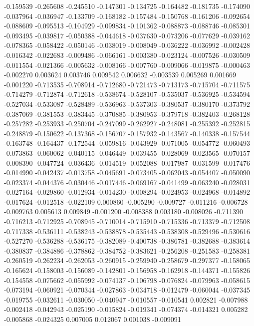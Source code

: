 -0.159539
-0.265608
-0.245510
-0.147301
-0.134725
-0.164482
-0.181735
-0.174090
-0.037964
-0.036947
-0.133709
-0.168182
-0.157484
-0.150768
-0.161206
-0.092654
-0.088609
-0.095513
-0.104929
-0.099834
-0.101362
-0.088873
-0.088746
-0.085301
-0.093495
-0.039817
-0.050388
-0.044618
-0.037630
-0.073206
-0.077629
-0.039162
-0.078365
-0.058422
-0.050146
-0.038019
-0.008049
-0.036222
-0.036992
-0.002428
-0.016342
-0.022683
-0.009486
-0.066161
-0.003380
-0.023124
-0.007526
-0.030509
-0.011554
-0.021366
-0.005632
-0.008166
-0.007760
-0.009066
-0.019875
-0.000463
-0.002270
0.003624
0.003746
0.009542
0.006632
-0.003539
0.005269
0.001669
-0.001220
-0.713535
-0.708914
-0.712680
-0.721473
-0.713173
-0.715704
-0.711575
-0.714279
-0.712874
-0.712618
-0.538674
-0.528107
-0.535037
-0.536925
-0.534594
-0.527034
-0.533087
-0.528489
-0.536963
-0.537303
-0.380537
-0.380170
-0.373792
-0.387069
-0.381553
-0.383445
-0.370885
-0.380953
-0.379718
-0.382403
-0.268128
-0.257282
-0.253933
-0.250704
-0.247099
-0.262927
-0.248081
-0.255392
-0.252815
-0.248879
-0.150622
-0.137368
-0.156707
-0.157932
-0.143567
-0.140338
-0.157544
-0.163748
-0.164437
-0.172544
-0.059816
-0.043929
-0.071005
-0.054772
-0.060493
-0.073863
-0.060062
-0.040115
-0.046449
-0.039455
-0.028069
-0.023565
-0.070157
-0.008390
-0.047724
-0.036436
-0.014519
-0.052088
-0.017987
-0.031599
-0.017476
-0.014990
-0.042437
-0.013758
-0.045691
-0.073405
-0.062043
-0.054407
-0.050090
-0.023374
-0.044376
-0.030446
-0.017446
-0.069167
-0.041499
-0.063240
-0.028031
-0.027164
-0.029860
-0.012934
-0.014230
-0.008294
-0.024953
-0.024968
-0.014892
-0.017624
-0.012518
-0.022109
0.000860
-0.005290
-0.009727
-0.011216
-0.006728
-0.009763
0.005613
0.009849
-0.001200
-0.008388
0.003180
-0.008026
-0.711390
-0.716213
-0.712925
-0.708945
-0.710014
-0.715910
-0.715336
-0.713379
-0.712508
-0.717338
-0.536111
-0.538243
-0.538878
-0.535443
-0.538308
-0.529496
-0.530616
-0.527270
-0.536288
-0.536175
-0.382089
-0.400738
-0.386781
-0.382688
-0.383614
-0.380837
-0.384886
-0.378862
-0.384752
-0.383621
-0.256208
-0.251583
-0.258381
-0.260519
-0.262234
-0.262053
-0.260915
-0.259940
-0.258679
-0.297377
-0.158065
-0.165624
-0.158003
-0.156089
-0.142801
-0.156958
-0.162918
-0.144371
-0.155826
-0.154558
-0.075662
-0.055992
-0.074137
-0.106798
-0.076824
-0.079963
-0.058615
-0.073194
-0.060921
-0.070344
-0.027863
-0.034718
-0.012479
-0.060044
-0.037345
-0.019755
-0.032611
-0.030050
-0.040947
-0.010557
-0.010541
0.002821
-0.007988
-0.002418
-0.042943
-0.025190
-0.015824
-0.019341
-0.074374
-0.014321
0.005282
-0.005868
-0.024325
0.007005
0.012067
0.001038
-0.009091
